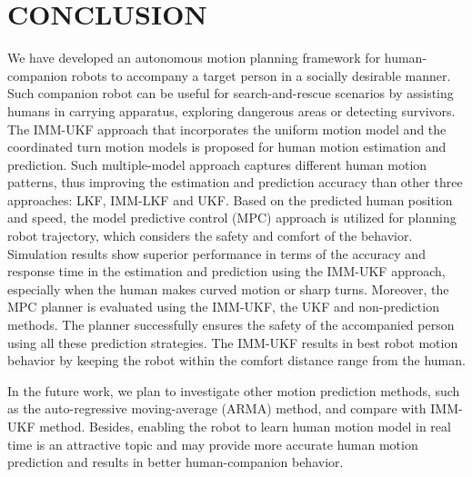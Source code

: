 \documentclass[letterpaper, 10 pt, conference]{ieeeconf}
\begin{document}
	\section{CONCLUSION}\label{sec:conclusion}
	We have developed an autonomous motion planning framework for human-companion robots to accompany a target person in a socially desirable manner.
	Such companion robot can be useful for search-and-rescue scenarios by assisting humans in carrying apparatus, exploring dangerous areas or detecting survivors.
	The IMM-UKF approach that incorporates the uniform motion model and the coordinated turn motion models is proposed for human motion estimation and prediction.
	Such multiple-model approach captures different human motion patterns, thus improving the estimation and prediction accuracy than other three approaches: LKF, IMM-LKF and UKF.
	Based on the predicted human position and speed, the model predictive control (MPC) approach is utilized for planning robot trajectory, which considers the safety and comfort of the behavior.
	Simulation results show superior performance in terms of the accuracy and response time in the estimation and prediction using the IMM-UKF approach, especially when the human makes curved motion or sharp turns.
	Moreover, the MPC planner is evaluated using the IMM-UKF, the UKF and non-prediction methods.
	The planner successfully ensures the safety of the accompanied person using all these prediction strategies.
	The IMM-UKF results in best robot motion behavior by keeping the robot within the comfort distance range from the human.
	
	In the future work, we plan to investigate other motion prediction methods, such as the auto-regressive moving-average (ARMA) method, and compare with IMM-UKF method.
	Besides,  enabling the robot to learn human motion model in real time is an attractive topic and may provide more accurate human motion prediction and results in better human-companion behavior.
	
\end{document}
